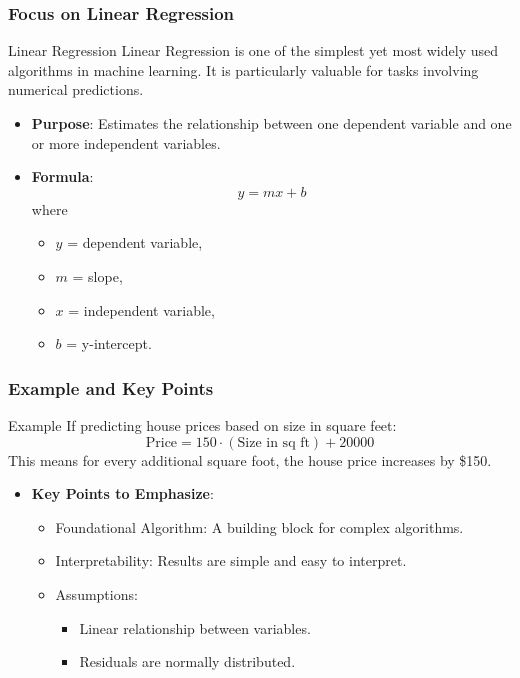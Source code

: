 \documentclass[aspectratio=169]{beamer}
\begin{document}
\begin{frame}[fragile]
    \frametitle{Focus on Linear Regression}
    \begin{block}{Linear Regression}
        Linear Regression is one of the simplest yet most widely used algorithms in machine learning. It is particularly valuable for tasks involving numerical predictions.
    \end{block}
    \begin{itemize}
        \item \textbf{Purpose}: Estimates the relationship between one dependent variable and one or more independent variables.
        \item \textbf{Formula}:
        \begin{equation}
        y = mx + b
        \end{equation}
        where 
        \begin{itemize}
            \item \(y\) = dependent variable,
            \item \(m\) = slope,
            \item \(x\) = independent variable,
            \item \(b\) = y-intercept.
        \end{itemize}
    \end{itemize}
\end{frame}

\begin{frame}[fragile]
    \frametitle{Example and Key Points}
    \begin{block}{Example}
        If predicting house prices based on size in square feet:
        \begin{equation}
        \text{Price} = 150 \cdot (\text{Size in sq ft}) + 20000
        \end{equation}
        This means for every additional square foot, the house price increases by \$150.
    \end{block}
    \begin{itemize}
        \item \textbf{Key Points to Emphasize}:
        \begin{itemize}
            \item Foundational Algorithm: A building block for complex algorithms.
            \item Interpretability: Results are simple and easy to interpret.
            \item Assumptions:
            \begin{itemize}
                \item Linear relationship between variables.
                \item Residuals are normally distributed.
            \end{itemize}
        \end{itemize}
    \end{itemize}
\end{frame}
\end{document}
